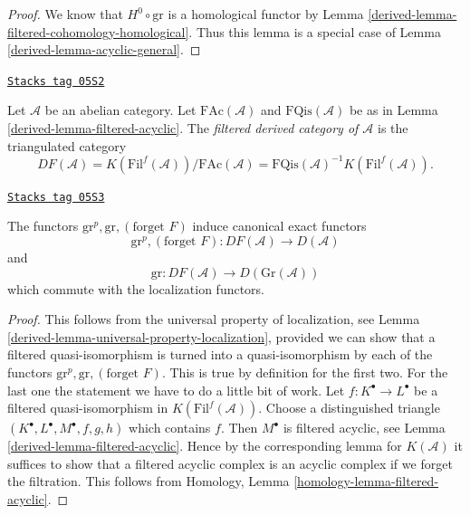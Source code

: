 \begin{proof}

We know that $H^0 \circ \text{gr}$ is a homological functor by
Lemma \ref{derived-lemma-filtered-cohomology-homological}.
Thus this lemma is a special case of
Lemma \ref{derived-lemma-acyclic-general}.
\end{proof}

\begin{definition}
\label{derived-definition-filtered-derived}
\href{https://stacks.math.columbia.edu/tag/05S2}{\texttt{Stacks tag 05S2}}

Let $\mathcal{A}$ be an abelian category.
Let $\text{FAc}(\mathcal{A})$ and $\text{FQis}(\mathcal{A})$
be as in
Lemma \ref{derived-lemma-filtered-acyclic}.
The {\it filtered derived category of $\mathcal{A}$}
is the triangulated category
$$
DF(\mathcal{A}) =
K(\text{Fil}^f(\mathcal{A}))/\text{FAc}(\mathcal{A}) =
\text{FQis}(\mathcal{A})^{-1} K(\text{Fil}^f(\mathcal{A})).
$$
\end{definition}

\begin{lemma}
\label{derived-lemma-filtered-derived-functors}
\href{https://stacks.math.columbia.edu/tag/05S3}{\texttt{Stacks tag 05S3}}

The functors $\text{gr}^p, \text{gr}, (\text{forget }F)$ induce
canonical exact functors
$$
\text{gr}^p, (\text{forget }F):
DF(\mathcal{A})
\longrightarrow
D(\mathcal{A})
$$
and
$$
\text{gr}:
DF(\mathcal{A})
\longrightarrow
D(\text{Gr}(\mathcal{A}))
$$
which commute with the localization functors.
\end{lemma}

\begin{proof}

This follows from the universal property of localization, see
Lemma \ref{derived-lemma-universal-property-localization},
provided we can show that a filtered quasi-isomorphism is turned
into a quasi-isomorphism by each of the functors
$\text{gr}^p, \text{gr}, (\text{forget }F)$. This is true by definition
for the first two. For the last one the statement we have to do a little
bit of work. Let $f : K^\bullet \to L^\bullet$ be a filtered
quasi-isomorphism in $K(\text{Fil}^f(\mathcal{A}))$.
Choose a distinguished triangle $(K^\bullet, L^\bullet, M^\bullet, f, g, h)$
which contains $f$. Then $M^\bullet$ is filtered acyclic, see
Lemma \ref{derived-lemma-filtered-acyclic}.
Hence by the corresponding lemma for $K(\mathcal{A})$ it suffices
to show that a filtered acyclic complex is an acyclic complex if
we forget the filtration.
This follows from
Homology, Lemma \ref{homology-lemma-filtered-acyclic}.
\end{proof}

